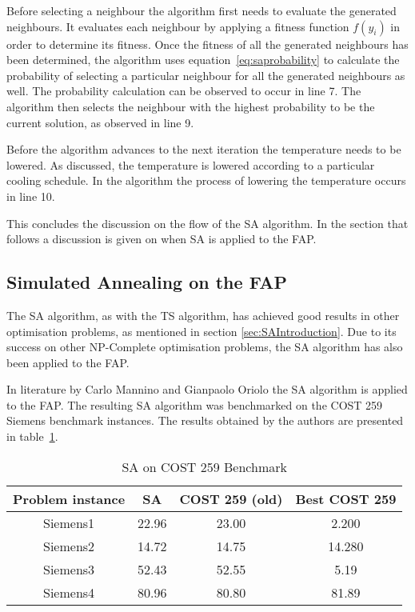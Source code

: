 Before selecting a neighbour the algorithm first needs to evaluate the generated neighbours. It evaluates each neighbour by applying a fitness function $f(y_i)$ in order to determine its fitness.
Once the fitness of all the generated neighbours has been determined, the algorithm uses equation~\ref{eq:saprobability} to calculate the probability of selecting a particular neighbour for all the generated neighbours as well. The probability calculation can be observed to occur in line 7. The algorithm then selects the neighbour with the highest probability to be the current solution, as observed in line 9. 

Before the algorithm advances to the next iteration the temperature needs to be lowered. As discussed, the temperature is lowered according to a particular cooling schedule. In the algorithm the process of lowering the temperature occurs in line 10. 

This concludes the discussion on the flow of the SA algorithm. In the section that follows a discussion is given on when \gls{SA} is applied to the \gls{FAP}.
\subsection{Simulated Annealing on the \gls{FAP}}
The \gls{SA} algorithm, as with the \gls{TS} algorithm, has achieved good results in other optimisation problems, as mentioned in section \ref{sec:SAIntroduction}. Due to its success on other NP-Complete optimisation problems, the \gls{SA} algorithm has also been applied to the \gls{FAP}.

In literature by Carlo Mannino and Gianpaolo Oriolo\cite{SolvingSuperIntervalGraphs} the \gls{SA} algorithm is applied to the \gls{FAP}. The resulting \gls{SA} algorithm was benchmarked on the \gls{COST} 259 Siemens benchmark instances. The results obtained by the authors are presented in table~\ref{tab:SA}. 

\begin{table}[H]
\centering
	\begin{tabular}{| c | c | c | c |}
	\hline
	Problem instance & \gls{SA} & \gls{COST} 259 (old) & Best \gls{COST} 259 \\ \hline
	Siemens1 & 22.96 & 23.00 & 2.200\\ \hline
	Siemens2 & 14.72 & 14.75 & 14.280\\ \hline
	Siemens3 & 52.43 & 52.55 & 5.19\\ \hline
	Siemens4 & 80.96 & 80.80 & 81.89\\ \hline
	\end{tabular}
\caption{SA on \gls{COST} 259 Benchmark}
\label{tab:SA}
\end{table}

